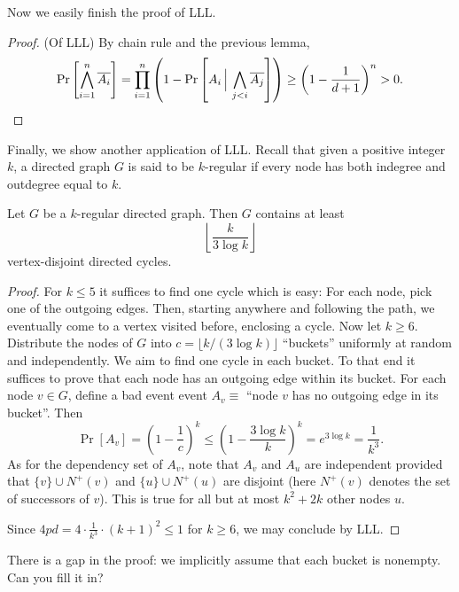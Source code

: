 Now we easily finish the proof of LLL.
\begin{proof}(Of LLL) By chain rule and the previous lemma,
\[
\Pr\left[\bigwedge_{i=1}^n \overline{A_i}\right]=\prod_{i=1}^n\left( 1-\Pr\left[A_i\,\Big|\, \bigwedge_{j<i} \overline{A_j}\right] \right)\geq \left(1-\frac1{d+1}\right)^n>0. \qedhere
\]
\end{proof}

Finally, we show another application of LLL. Recall that given a positive integer $k$, a directed graph $G$ is said to be $k$-regular if every node has both indegree and outdegree equal to $k$.
\begin{claim} Let $G$ be a $k$-regular directed graph. Then $G$ contains at least $$\left\lfloor\frac{k}{3\log k}\right\rfloor$$ vertex-disjoint directed cycles.
\end{claim}
\begin{proof} For $k\leq 5$ it suffices to find one cycle which is easy: For each node, pick one of the outgoing edges. Then, starting anywhere and following the path, we eventually come to a vertex visited before, enclosing a cycle. Now let $k\geq 6$. Distribute the nodes of $G$ into $c=\lfloor k/(3\log k)\rfloor$ ``buckets'' uniformly at random and independently. We aim to find one cycle in each bucket. To that end it suffices to prove that each node has an outgoing edge within its bucket. For each node $v\in G$, define a bad event event $A_v\equiv$ ``node $v$ has no outgoing edge in its bucket''. Then
$$\Pr[A_v]=\left(1-\frac1c\right)^k\leq\left(1-\frac{3\log k}{k}\right)^k=e^{3\log k}=\frac1{k^3}.$$
As for the dependency set of $A_v$, note that $A_v$ and $A_u$ are independent provided that $\{v\}\cup N^+(v)$ and $\{u\}\cup N^+(u)$ are disjoint (here $N^+(v)$ denotes the set of successors of $v$). This is true for all but at most $k^2+2k$ other nodes $u$.

Since $4pd=4\cdot\frac1{k^3}\cdot (k+1)^2\leq 1$ for $k\geq 6$, we may conclude by LLL.
\end{proof}
\begin{remark} There is a gap in the proof: we implicitly assume that each bucket is nonempty. Can you fill it in?
\end{remark}

